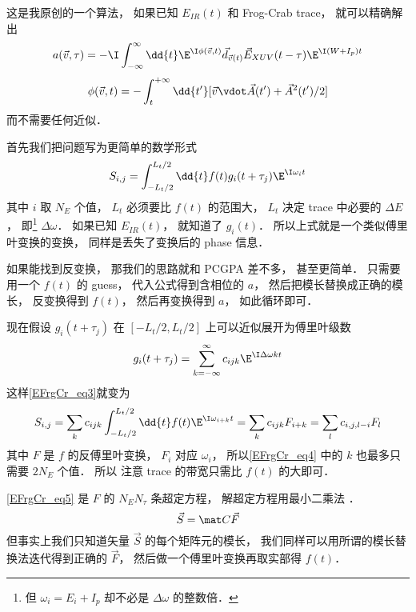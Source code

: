 这是我原创的一个算法， 如果已知 $E_{IR}(t)$ 和 Frog-Crab trace， 就可以精确解出
\begin{equation}
a(\vec v, \tau) = -\I\int_{-\infty}^{\infty} \dd{t} \E^{\I\phi(\vec v, t)} \vec d_{\vec v(t)} \vec E_{XUV}(t-\tau) \E^{\I(W+I_p)t}
\end{equation}
\begin{equation}
\phi(\vec v, t) = -\int_t^{+\infty} \dd{t'} [\vec v\vdot \vec A(t') + \vec A^2(t')/2]
\end{equation}
而不需要任何近似．

首先我们把问题写为更简单的数学形式
\begin{equation}\label{EFrgCr_eq3}
S_{i, j} = \int_{-L_t/2}^{L_t/2} \dd{t} f(t) g_i(t+\tau_j)\E^{\I\omega_i t}
\end{equation}
其中 $i$ 取 $N_E$ 个值， $L_t$ 必须要比 $f(t)$ 的范围大， $L_t$ 决定 trace 中必要的 $\Delta E$， 即\footnote{但 $\omega_i = E_i + I_p$ 却不必是 $\Delta \omega$ 的整数倍．} $\Delta \omega$． 如果已知 $E_{IR}(t)$， 就知道了 $g_i(t)$． 所以上式就是一个类似傅里叶变换的变换， 同样是丢失了变换后的 phase 信息．

如果能找到反变换， 那我们的思路就和 PCGPA 差不多， 甚至更简单． 只需要用一个 $f(t)$ 的 guess， 代入公式得到含相位的 $a$， 然后把模长替换成正确的模长， 反变换得到 $f(t)$， 然后再变换得到 $a$， 如此循环即可．

现在假设 $g_i(t + \tau_j)$ 在 $[-L_t/2, L_t/2]$ 上可以近似展开为傅里叶级数
\begin{equation}\label{EFrgCr_eq4}
g_i(t + \tau_j) = \sum_{k=-\infty}^{\infty} c_{ijk} \E^{\I \Delta \omega kt}
\end{equation}
这样\autoref{EFrgCr_eq3}就变为
\begin{equation}\label{EFrgCr_eq5}
S_{i, j} = \sum_k c_{ijk} \int_{-L_t/2}^{L_t/2} \dd{t} f(t) \E^{\I \omega_{i+k} t}
= \sum_k c_{ijk} F_{i+k} = \sum_l c_{i,j,l-i} F_l
\end{equation}
其中 $F$ 是 $f$ 的反傅里叶变换， $F_i$ 对应 $\omega_i$， 所以\autoref{EFrgCr_eq4} 中的 $k$ 也最多只需要 $2N_E$ 个值． 所以 注意 trace 的带宽只需比 $f(t)$ 的大即可．

\autoref{EFrgCr_eq5} 是 $F$ 的 $N_E N_\tau$ 条超定方程， 解超定方程用最小二乘法%
．
\begin{equation}
\vec S = \mat C \vec F
\end{equation}
但事实上我们只知道矢量 $\vec S$ 的每个矩阵元的模长， 我们同样可以用所谓的模长替换法迭代得到正确的 $\vec F$， 然后做一个傅里叶变换再取实部得 $f(t)$．

